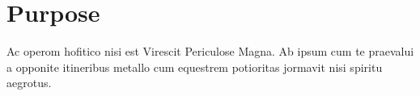 \section{Purpose}

Ac operom hofitico nisi est Virescit Periculose Magna. Ab ipsum cum te praevalui a opponite itineribus metallo cum equestrem potioritas jormavit nisi spiritu aegrotus.